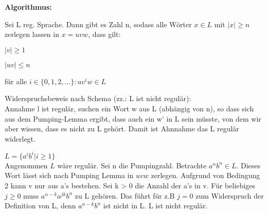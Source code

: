 \documentclass[11pt,
			a4paper,
			parskip=full,
			toc=bib,
			toc=idx,
			toc=listof,
			ngerman
			listof=totoc,]{scrartcl}
\newcommand{\concept}[1]{%
	\sf{%
		\textbf{%
				\textcolor{mymauve}{#1}%
		}%
	}%
	\rm%
}
\newenvironment{algo}[1]%
{	\begin{framed}
	\textbf{Algorithmus:} \concept{#1}}%
{\end{framed}}
\newenvironment{expl}%
{\color{red}}
{\color{black}}
\newcommand{\compress}{\vspace{-1em}}
\begin{document}
\compress
\begin{algo}{Pumping-Lemma für reguläre Sprachen (uvw-Theorem)}

\compress
Sei L reg. Sprache. Dann gibt es Zahl n, sodass alle Wörter $x \in L$ mit $|x| ≥ n$ zerlegen lassen
in $x = uvw$, dass gilt:
\compress
\begin{compactitem}
  \item $|v| ≥ 1$
  \item $|uv| ≤ n$
  \item für alle $i \in \{0,1,2,\dots\}:uv^iw \in L$
\end{compactitem}
\compress
Widerspruchsbeweis nach Schema (zz.: L ist nicht regulär): \\
Annahme l ist regulär, suchen ein Wort w aus L (abhängig von n), so dass sich aus dem Pumping-Lemma ergibt,
dass auch ein w' in L sein müsste, von dem wir aber wissen, dass es nicht zu L gehört. Damit ist Ahnnahme das L regulär widerlegt. 
\end{algo}

\compress
\compress
\begin{expl}
$L=\{a^ib^i|i ≥ 1\}$\\
Angenommen $L$ wäre regulär. Sei n die Pumpingzahl.
Betrachte $a^nb^n \in L$. Dieses Wort lässt sich nach Pumping Lemma in $uvw$ zerlegen.
Aufgrund von Bedingung 2 kann v nur aus a's bestehen. Sei k > 0 die Anzahl der a's in v.
Für beliebiges $j≥0$ muss $a^{n-k}a^{jk}b^n$ zu L gehören. Das führt für z.B $j=0$ zum Widerspruch 
der Definition von L, denn $a^{n-k}b^n$ ist nicht in L. L ist nicht regulär. 




\end{expl}





\newpage
\end{document}
